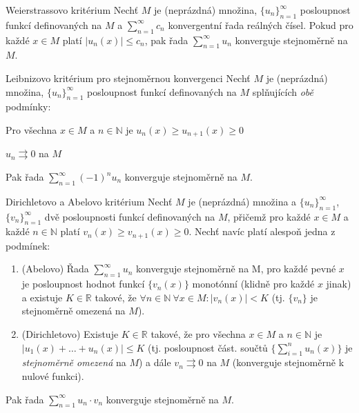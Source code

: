 \begin{vetaN}{Weierstrassovo kritérium}
Nechť $M$ je (neprázdná) množina, $\{u_n\}_{n=1}^{\infty}$ posloupnost funkcí definovaných na $M$ a $\sum_{n=1}^{\infty} c_n$ konvergentní řada reálných čísel. Pokud pro každé $x \in M$ platí $|u_n(x)| \le c_n$, pak řada $\sum_{n=1}^{\infty} u_n$ konverguje stejnoměrně na $M$.
\end{vetaN}

\begin{vetaN}{Leibnizovo kritérium pro stejnoměrnou konvergenci}
Nechť $M$ je (neprázdná) množina, $\{u_n\}_{n=1}^{\infty}$ posloupnost funkcí definovaných na $M$ splňujících \emph{obě} podmínky:

\begin{penumerate}
	\item Pro všechna $x \in M$ a $n \in \mathbb{N}$ je $u_n(x) \ge u_{n+1}(x) \ge 0$
	\item $u_n \rightrightarrows 0$ na $M$
\end{penumerate}
Pak řada $\sum_{n=1}^{\infty} (-1)^{n}u_n$ konverguje stejnoměrně na $M$.
\end{vetaN}

\begin{vetaN}{Dirichletovo a Abelovo kritérium}
Nechť $M$ je (neprázdná) množina a $\{u_n\}_{n=1}^{\infty}$, $\{v_n\}_{n=1}^{\infty}$ dvě posloupnosti funkcí definovaných na $M$, přičemž pro každé $x \in M$ a každé $n \in \mathbb{N}$ platí $v_n(x) \ge v_{n+1}(x) \ge 0$. Nechť navíc platí alespoň jedna z podmínek:
\begin{enumerate}
	\item (Abelovo) Řada $\sum_{n=1}^{\infty} u_n$ konverguje stejnoměrně na M, %
	pro každé pevné $x$ je posloupnost hodnot funkcí $\{v_n(x)\}$ monotónní (klidně pro každé $x$ jinak)
	a existuje $K\in\mathbb{R}$ takové, že $\forall n\in\mathbb{N}\ \forall x\in M: |v_n(x)|<K$ 
	(tj. $\{v_n\}$ je stejnoměrně omezená na $M$). %
	\item (Dirichletovo) Existuje $K \in \mathbb{R}$ takové, že pro všechna $x \in M$ a $n \in \mathbb{N}$ je $|u_1(x) + \dots + u_n(x)| \le K$
	(tj. posloupnost část. součtů $\{\sum_{i=1}^n u_n(x)\}$ je \emph{stejnoměrně omezená} na $M$)
	a dále $v_n \rightrightarrows 0$ na $M$ (konverguje stejnoměrně k nulové funkci).
\end{enumerate}

Pak řada $\sum_{n=1}^{\infty} u_n\cdot v_n$ konverguje stejnoměrně na $M$.
\end{vetaN}

